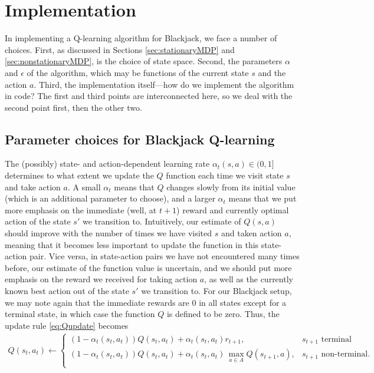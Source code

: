 \section{Implementation} \label{sec:implementation}
In implementing a Q-learning algorithm for Blackjack, we face a number of choices.
First, as discussed in Sections \ref{sec:stationaryMDP} and \ref{sec:nonstationaryMDP}, is the choice of state space.
Second, the parameters $\alpha$ and $\epsilon$ of the algorithm, which may be functions of the current state $s$ and
the action $a$. Third, the implementation itself---how do we implement the algorithm in code? The first and third points
are interconnected here, so we deal with the second point first, then the other two.

\subsection{Parameter choices for Blackjack Q-learning} \label{sec:paramchoices}
The (possibly) state- and action-dependent learning rate $\alpha_t(s, a) \in (0, 1]$ determines to what extent we update 
the $Q$ function each time we visit state $s$ and take action $a$. A small $\alpha_t$ means that $Q$ changes slowly
from its initial value (which is an additional parameter to choose), and a larger $\alpha_t$ means that we put more
emphasis on the immediate (well, at $t+1$) reward and currently optimal action of the state $s'$ we transition to.
%
Intuitively, our estimate of $Q(s,a)$ should improve with the number of times we have visited $s$ and taken action $a$,
meaning that it becomes less important to update the function in this state-action pair. Vice versa, in state-action pairs
we have not encountered many times before, our estimate of the function value is uncertain, and we should put more emphasis
on the reward we received for taking action $a$, as well as the currently known best action out of the state $s'$ we transition to.
For our Blackjack setup, we may note again that the immediate rewards are 0 in all states except for a terminal state, 
in which case the function $Q$ is defined to be zero. Thus, the update rule \ref{eq:Qupdate} becomes
\begin{align} \label{eq:bjQupdate}
          Q(s_t,a_t)  \leftarrow 
          \begin{cases}
            (1-\alpha_t(s_t,a_t))Q(s_t,a_t) + \alpha_t(s_t,a_t) r_{t+1}, &s_{t+1} \text{ terminal} \\
            (1-\alpha_t(s_t,a_t))Q(s_t,a_t) + \alpha_t(s_t,a_t) \, \underset{a \in A}{\max} Q(s_{t+1},a), &s_{t+1} \text{ non-terminal}. \\
          \end{cases}
\end{align}


